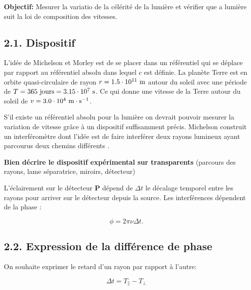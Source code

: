 \documentclass[french, a4paper, 10pt, twocolumn, landscape]{article}
\begin{document}
\textbf{Objectif:} Mesurer la variatio de la célérité de la lumière et vérifier que a lumière suit la loi de composition des vitesses.

\subsection*{2.1. Dispositif}

L'idée de Michelson et Morley est de se placer dans un référentiel qui se déplace par rapport au référentiel absolu dans lequel $c$ est définie. La planète Terre est en orbite quasi-circulaire de rayon $r=1.5\cdot 10^{11}~\rm m$ autour du soleil avec une période de $T = 365~\text{jours} = 3.15\cdot 10^{7}~ \rm s$. Ce qui donne une vitesse de la Terre autour du soleil de $v=3.0\cdot 10^4~\rm m\cdot s^{-1}$.

S'il existe un référentiel absolu pour la lumière on devrait pouvoir mesurer la variation de vitesse grâce à un dispositif suffisamment précis. Michelson construit un interféromètre dont l'idée est de faire interférer deux rayons lumineux ayant parcourus deux chemins différents .

\begin{center}
	\textbf{Bien décrire le dispositif expérimental sur transparents} (parcours des rayons, lame séparatrice, miroirs, détecteur)
\end{center}


L'éclairement sur le détecteur \textbf{P} dépend de $\Delta t$ le décalage temporel entre les rayons pour arriver sur le détecteur depuis la source. Les interférences dépendent de la phase : 

\begin{equation}
	\phi = 2\pi\nu\Delta t.
\end{equation}

\subsection*{2.2. Expression de la différence de phase}

On souhaite exprimer le retard d'un rayon par rapport à l'autre:

\begin{equation}
	\Delta t = T_{\parallel}-T_{\perp}
\end{equation}
\end{document}
